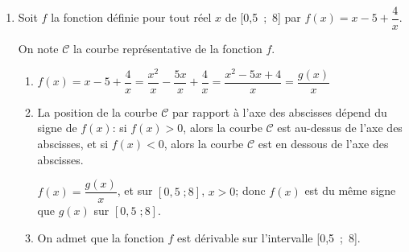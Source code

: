 \begin{enumerate}
\begin{enumerate}
Donc:  $y_{\text{A}_{n+1}} - y_{\text{A}_{n}} = \left (n^2-3n\right ) - \left (n^2-5n+4\right ) = n^2 -3n -n^2 +5n -4=2n-4$.

Or $x_{\text{A}_{n+1}} - x_{\text{A}_{n}} = n+1-n=1$;
donc $a_n=\dfrac{y_{\text{A}_{n+1}} - y_{\text{A}_n}}{x_{\text{A}_{n+1}} - x_{\text{A}_n}} = \dfrac{2n-4}{1}=2n-4$.



		\item 
$a_{n+1}-a_n= \left (2(n+1)-4\right ) - \left (2n-4\right ) = 2n+2-4-2n+4=2$

Donc la suite $(a_n)$ est arithmétique de raison 2.
	\end{enumerate}
	
\item Soit $f$ la fonction définie pour tout réel $x$ de [0,5~;~8] par
$f(x) = x - 5 + \dfrac 4 x.$

On note $\mathcal{C}$ la courbe représentative de la fonction $f$.
	\begin{enumerate}
		\item 
$f(x) = x - 5 + \dfrac 4 x = \dfrac{x^2}{x} - \dfrac{5x}{x} + \dfrac{4}{x}= \dfrac{x^2-5x+4}{x}=\dfrac{g(x)}{x}$		

		\item 
La position de la courbe $\mathcal{C}$ par rapport à l'axe des abscisses dépend du signe de $f(x)$: si $f(x)>0$, alors la courbe $\mathcal{C}$ est au-dessus de l'axe des abscisses, et  si $f(x) < 0$, alors la courbe $\mathcal{C}$ est en dessous de l'axe des abscisses.

$f(x)=\dfrac{g(x)}{x}$, et sur $[0,5\;; 8]$, $x>0$; donc $f(x)$ est du même signe que $g(x)$ sur  $[0,5\;; 8]$.

\medskip


		\item On admet que la fonction $f$ est dérivable sur l'intervalle [0,5~;~8].



\end{enumerate}
\end{enumerate}
